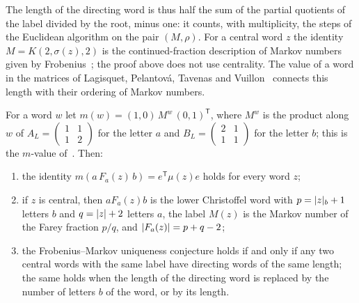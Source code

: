 The length of the directing word is thus half the sum of the partial quotients of the label divided
by the root, minus one: it counts, with multiplicity, the steps of the Euclidean algorithm on the
pair $(M,\rho)$. For a central word $z$ the identity $M=K(2,\sigma(z),2)$ is the continued-fraction
description of Markov numbers given by Frobenius~\cite[formula~(6), p.~472]{Frobenius1913}; the
proof above does not use centrality. The value of a word in the matrices of Lagisquet, Pelantov\'a, Tavenas and
Vuillon~\cite{LagisquetEtAl2021} connects this length with their ordering of Markov numbers.

\begin{proposition}
\label{prop:lengths-uniqueness}
For a word $w$ let $m(w)=(1,0)\,M^w\,(0,1)^{\mathsf T}$, where $M^w$ is the product along $w$ of
$A_L=\left(\begin{smallmatrix}1&1\\1&2\end{smallmatrix}\right)$ for the letter $a$ and
$B_L=\left(\begin{smallmatrix}2&1\\1&1\end{smallmatrix}\right)$ for the letter $b$; this is the
$m$-value of~\cite{LagisquetEtAl2021}. Then:
\begin{enumerate}[label=\textup{(\roman*)}]
\item the identity $m(a\,F_a(z)\,b)=e^{\mathsf T}\mu(z)e$ holds for every word $z$;
\item if $z$ is central, then $aF_a(z)b$ is the lower Christoffel word with $p=\lvert z\rvert_b+1$ letters $b$
 and $q=\lvert z\rvert+2$ letters $a$, the label $M(z)$ is the Markov number of the Farey fraction $p/q$,
 and $\lvert F_a(z)\rvert=p+q-2$;
\item the Frobenius--Markov uniqueness conjecture holds if and only if any two central words with
 the same label have directing words of the same length; the same holds when the length of the
 directing word is replaced by the number of letters $b$ of the word, or by its length.
\end{enumerate}
\end{proposition}

